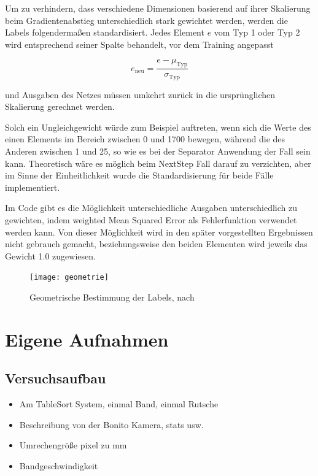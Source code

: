 Um zu verhindern, dass verschiedene Dimensionen basierend auf ihrer Skalierung beim Gradientenabstieg unterschiedlich 
stark gewichtet werden, werden die Labels folgendermaßen standardisiert.
Jedes Element \(e\) vom Typ 1 oder Typ 2 wird entsprechend seiner Spalte behandelt, vor dem Training angepasst

\begin{equation*}
	e_{\text{neu}} = \frac{e - \mu_{\text{Typ}}}{\sigma_{\text{Typ}}}
\end{equation*}

und Ausgaben des Netzes müssen umkehrt zurück in die ursprünglichen Skalierung gerechnet werden.

Solch ein Ungleichgewicht würde zum Beispiel auftreten, wenn sich die Werte des einen Elements im Bereich zwischen 0 und 1700 bewegen, während die des Anderen zwischen 1 und 25,
so wie es bei der Separator Anwendung der Fall sein kann.   
Theoretisch wäre es möglich beim NextStep Fall darauf zu verzichten, aber im Sinne der Einheitlichkeit wurde 
die Standardisierung für beide Fälle implementiert.


Im Code gibt es die Möglichkeit unterschiedliche Ausgaben unterschiedlich zu gewichten, indem weighted Mean Squared Error als Fehlerfunktion verwendet werden kann. 
Von dieser Möglichkeit wird in den später vorgestellten Ergebnissen nicht gebrauch gemacht, beziehungsweise den beiden Elementen wird jeweils das Gewicht 1.0 zugewiesen.

\begin{figure}[h]
	\centering
	\texttt{[image: geometrie]}
	\caption{Geometrische Bestimmung der Labels, nach \cite{Pfaff2018}}
	\label{fig:Schnittpunkt}
\end{figure}

\section{Eigene Aufnahmen}

\subsection{Versuchsaufbau}

\color{blue}
\begin{itemize}
	\item Am TableSort System, einmal Band, einmal Rutsche
	\item Beschreibung von der Bonito Kamera, stats usw.
	\item Umrechengröße pixel zu mm
	\item Bandgeschwindigkeit
\end{itemize}
\color{black}



